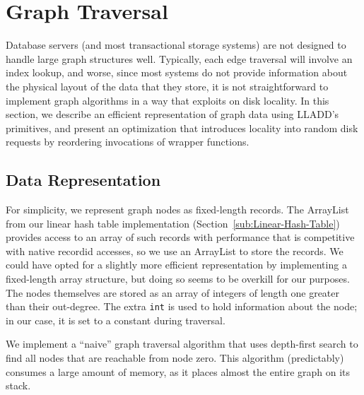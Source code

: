 \documentclass[10pt,letterpaper,twocolumn,english]{article}
\newcommand{\yad}{LLADD\xspace}
\begin{document}
%

\section{Graph Traversal\label{TransClos}}

Database servers (and most transactional storage systems) are not
designed to handle large graph structures well.  Typically, each edge
traversal will involve an index lookup, and worse, since most systems
do not provide information about the physical layout of the data that
they store, it is not straightforward to implement graph algorithms in
a way that exploits on disk locality.  In this section, we describe an
efficient representation of graph data using \yad's primitives, and
present an optimization that introduces locality into random disk
requests by reordering invocations of wrapper functions.

\subsection {Data Representation}

For simplicity, we represent graph nodes as
fixed-length records.  The ArrayList from our linear hash table
implementation (Section~\ref{sub:Linear-Hash-Table}) provides access to an
array of such records with performance that is competitive with native
recordid accesses, so we use an ArrayList to store the records.  We
could have opted for a slightly more efficient representation by
implementing a fixed-length array structure, but doing so seems to be
overkill for our purposes.  The nodes themselves are stored as an
array of integers of length one greater than their out-degree. The
extra {\tt int} is used to hold information about the node; in our case,
it is set to a constant during traversal.

We implement a ``naive'' graph traversal algorithm that uses depth-first search to find all nodes that are reachable from node zero.
This algorithm (predictably) consumes a large amount of memory, as
it places almost the entire graph on its stack.  
\end{document}
